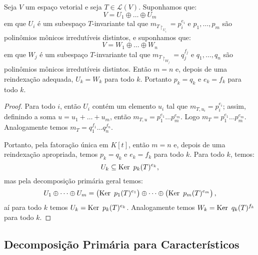 \documentclass[11pt,twoside,a4paper]{book}
\begin{document}
\begin{teorema}
Seja $V$ um espaço vetorial e seja $T\in\mathcal{L}(V)$. Suponhamos que:
\[
V=U_1\oplus\dots\oplus U_m
\]
em que $U_i$ é um subespaço $T$-invariante tal que $m_{T\upharpoonright_{U_i}}=p_i^{e_i}$ e $p_1,\dots,p_m$ são polinômios mônicos irredutíveis distintos, e suponhamos que:
\[
V=W_1\oplus\dots\oplus W_n
\]
em que $W_j$ é um subespaço $T$-invariante tal que $m_{T\upharpoonright_{W_j}}=q_j^{f_j}$ e $q_1,\dots,q_n$ são polinômios mônicos irredutíveis distintos. Então $m=n$ e, depois de uma reindexação adequada, $U_k=W_k$ para todo $k$. Portanto $p_k=q_k$ e $e_k=f_k$ para todo $k$.
\end{teorema}
\begin{proof}
Para todo $i$, então $U_i$ contém um elemento $u_i$ tal que $m_{T,u_i}=p_i^{e_i}$; assim, definindo a soma $u=u_1+\dots+u_m$, então $m_{T,u}=p_1^{e_1}\dots p_m^{e_m}$. Logo $m_T=p_1^{e_1}\dots p_m^{e_m}$. Analogamente temos $m_T=q_1^{f_1}\dots q_n^{f_n}$.

\medskip
\noindent
Portanto, pela fatoração única em $K[t]$, então $m=n$ e, depois de uma reindexação apropriada, temos $p_k=q_k$ e $e_k=f_k$ para todo $k$. Para todo $k$, temos:
\[
U_k\subseteq\Ker \ p_k(T)^{e_k},
\]
mas pela decomposição primária geral temos:
\[
U_1\oplus\dots\oplus U_m=\left(\Ker \ p_1(T)^{e_1}\right)\oplus\dots\oplus\left(\Ker \ p_m(T)^{e_m}\right),
\]
aí para todo $k$ temos $U_k=\operatorname{Ker} \ p_k(T)^{e_k}$. Analogamente temos $W_k=\Ker \ q_k(T)^{f_k}$ para todo $k$.
\end{proof}

\subsection{Decomposição Primária para Característicos}
\end{document}
